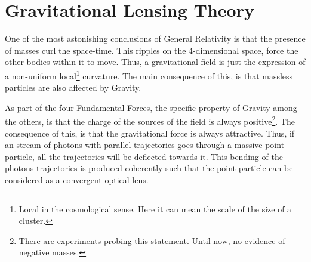 \chapter{Gravitational Lensing Theory}
\label{ch:theory}
One of the most astonishing conclusions of General Relativity is that the presence of masses curl the space-time. This ripples on the 4-dimensional space, force the other bodies within it to move. Thus, a gravitational field is just the expression of a non-uniform local\footnote{Local in the cosmological sense. Here it can mean the scale of the size of a cluster.} curvature. The main consequence of this, is that massless particles are also affected by Gravity.
\newline

As part of the four Fundamental Forces, the specific property of Gravity among the others, is that the charge of the sources of the field is always positive\footnote{There are experiments probing this statement. Until now, no evidence of negative masses.}. The consequence of this, is that the gravitational force is always attractive. Thus, if an stream of photons with parallel trajectories goes through a massive point-particle, all the trajectories will be deflected towards it. This bending of the photons trajectories is produced coherently such that the point-particle can be considered as a convergent optical lens.

